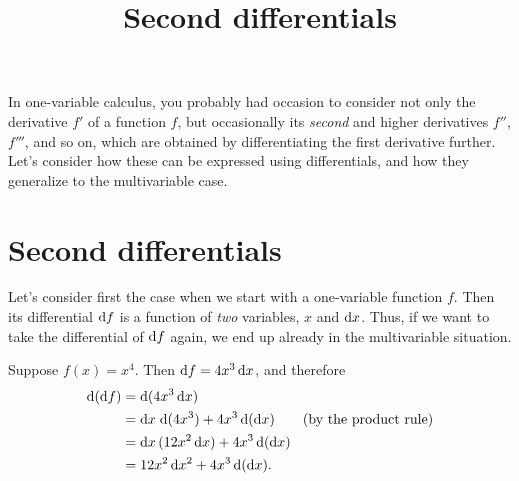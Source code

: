 \documentclass[12pt]{amsart}
\title{Second differentials}
\begin{document}
\maketitle

In one-variable calculus, you probably had occasion to consider not only the derivative $f'$ of a function $f$, but occasionally its \emph{second} and higher derivatives $f''$, $f'''$, and so on, which are obtained by differentiating the first derivative further.
Let's consider how these can be expressed using differentials, and how they generalize to the multivariable case.

\section{Second differentials}
\label{sec:second-differentials}

Let's consider first the case when we start with a one-variable function $f$.
Then its differential $\mathrm{d} f$ is a function of \emph{two} variables, $x$ and $\mathrm{d} x$.
Thus, if we want to take the differential of $\mathrm{d} f$ again, we end up already in the multivariable situation.

\begin{eg}
  Suppose $f(x) = x^4$.  Then $\mathrm{d} f = 4x^3 \,\mathrm{d} x$, and therefore
  \begin{align*}
    \mathrm{d}(\mathrm{d} f) &= \mathrm{d}(4x^3 \,\mathrm{d} x)\\
    &= \mathrm{d} x \;\mathrm{d}(4x^3) + 4x^3 \, \mathrm{d}(\mathrm{d} x) \qquad\text{(by the product rule)}\\
    &= \mathrm{d} x \,(12x^2\,\mathrm{d} x) + 4x^3 \, \mathrm{d}(\mathrm{d} x)\\
    &= 12x^2\,\mathrm{d} x^2 + 4x^3 \, \mathrm{d}(\mathrm{d} x).
  \end{align*}
\end{eg}
\end{document}
